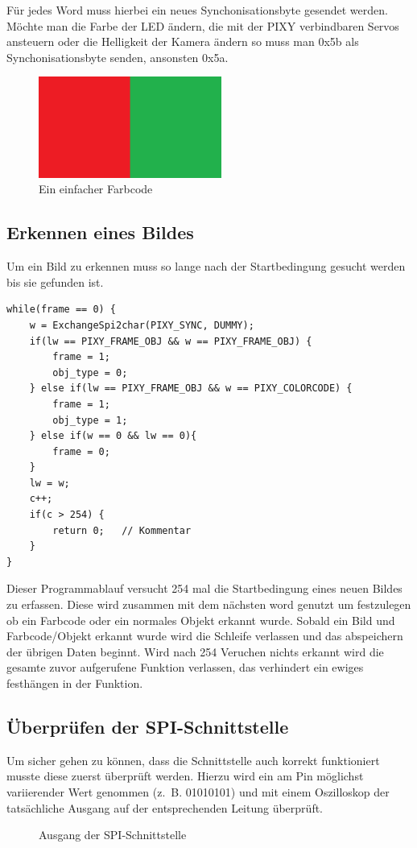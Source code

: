 Für jedes Word muss hierbei ein neues Synchonisationsbyte gesendet werden.\\
Möchte man die Farbe der LED ändern, die mit der PIXY verbindbaren Servos ansteuern oder die Helligkeit der Kamera ändern so muss man 0x5b als Synchonisationsbyte senden, ansonsten 0x5a.

\begin{figure}[t]
\begin{centering}
\includegraphics[width = 60mm]{Bilder/Farbcode}
\par\end{centering}
\caption{Ein einfacher Farbcode}
\label{Farbcode}
\end{figure}

\subsection{Erkennen eines Bildes}
Um ein Bild zu erkennen muss so lange nach der Startbedingung gesucht werden bis sie gefunden ist.

\lstset{language = C}
\begin{lstlisting}
while(frame == 0) {
    w = ExchangeSpi2char(PIXY_SYNC, DUMMY);
    if(lw == PIXY_FRAME_OBJ && w == PIXY_FRAME_OBJ) {
        frame = 1;
        obj_type = 0;
    } else if(lw == PIXY_FRAME_OBJ && w == PIXY_COLORCODE) {
        frame = 1;
        obj_type = 1;
    } else if(w == 0 && lw == 0){
        frame = 0;
    }
    lw = w;
    c++;
    if(c > 254) {
        return 0;	// Kommentar
    }
}
\end{lstlisting}

Dieser Programmablauf versucht 254 mal die Startbedingung eines neuen Bildes zu erfassen. Diese wird zusammen mit dem nächsten word genutzt um festzulegen ob ein Farbcode oder ein normales Objekt erkannt wurde. Sobald ein Bild und Farbcode/Objekt erkannt wurde wird die Schleife verlassen und das abspeichern der übrigen Daten beginnt. Wird nach 254 Veruchen nichts erkannt wird die gesamte zuvor aufgerufene Funktion verlassen, das verhindert ein ewiges festhängen in der Funktion.

\subsection{Überprüfen der SPI-Schnittstelle}
Um sicher gehen zu können, dass die Schnittstelle auch korrekt funktioniert musste diese zuerst überprüft werden. Hierzu wird ein am Pin möglichst variierender Wert genommen (z.~B. 01010101) und mit einem Oszilloskop der tatsächliche Ausgang auf der entsprechenden Leitung überprüft.
\begin{figure}[tbh]
\caption{Ausgang der SPI-Schnittstelle}
\label{SPI-Ausgang}
\end{figure}

